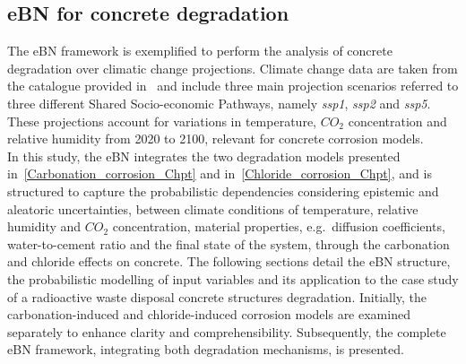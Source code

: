 \subsection{eBN for concrete degradation}
The eBN framework is exemplified to perform the analysis of concrete degradation over climatic change projections. 
Climate change data are taken from the catalogue provided in~\textcite{Copernicus_Climate_Change} and include three main projection scenarios referred to three different Shared Socio-economic Pathways, namely \textit{ssp1}, \textit{ssp2} and \textit{ssp5}. 
These projections account for variations in temperature, $CO_2$ concentration and relative humidity from 2020 to 2100, relevant for concrete corrosion models.\\ 
In this study, the eBN integrates the two degradation models presented in~\ref{Carbonation_corrosion_Chpt} and in~\ref{Chloride_corrosion_Chpt}, and is structured to capture the probabilistic dependencies considering epistemic and aleatoric uncertainties, between climate conditions of temperature, relative humidity and $CO_2$ concentration, material properties, e.g.~diffusion coefficients, water-to-cement ratio and the final state of the system, through the carbonation and chloride effects on concrete.
The following sections detail the eBN structure, the probabilistic modelling of input variables and its application to the case study of a radioactive waste disposal concrete structures degradation. 
Initially, the carbonation-induced and chloride-induced corrosion models are examined separately to enhance clarity and comprehensibility. 
Subsequently, the complete eBN framework, integrating both degradation mechanisms, is presented.


